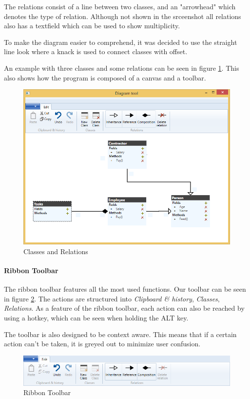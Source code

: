 The relations consist of a line between two classes, and an "arrowhead" which
denotes the type of relation. Although not shown in the srceenshot all relations
also has a textfield which can be used to show multiplicity.

To make the diagram easier to comprehend, it was decided to use the straight line
look where a knack is used to connect classes with offset.

An example with three classes and some relations can be seen in figure
\ref{classes}. This also shows how the program is composed of a canvas and a
toolbar.

\begin{figure}[H]
\centering
\includegraphics[width=\linewidth]{"img/example"}
\caption{Classes and Relations \label{classes}}
\end{figure}


\paragraph{Ribbon Toolbar}
The ribbon toolbar features all the most used functions. Our toolbar can be seen in
figure \ref{toolbar}. The actions are
structured into \textit{Clipboard \& history}, \textit{Classes},
\textit{Relations}. As a feature of the ribbon toolbar, each action can also be
reached by using a hotkey, which can be seen when holding the ALT key.

The toolbar is also designed to be context aware. This means that if a certain action
can't be taken, it is greyed out to minimize user confusion.
\begin{figure}[H]
\centering
\includegraphics[width=\linewidth]{"img/edit menu"}
\caption{Ribbon Toolbar \label{toolbar}}
\end{figure}

